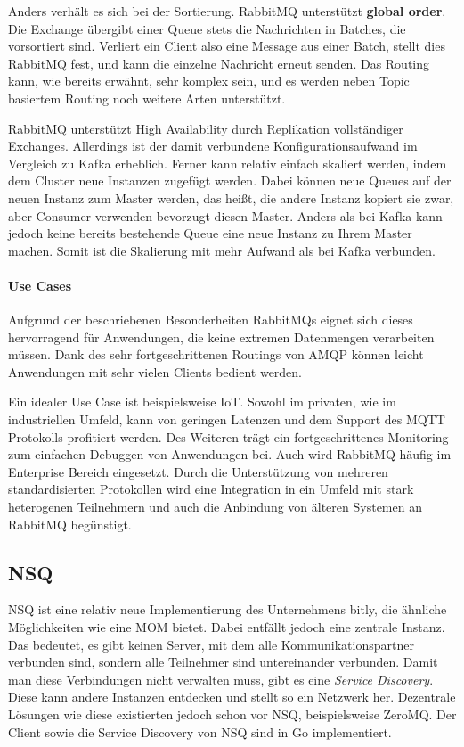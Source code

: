 Anders verhält es sich bei der Sortierung. RabbitMQ unterstützt \textbf{global order}. Die Exchange
übergibt einer Queue stets die Nachrichten in Batches, die vorsortiert sind.
Verliert ein Client also eine Message aus einer Batch, stellt dies RabbitMQ fest,
und kann die einzelne Nachricht erneut senden.
Das Routing kann, wie bereits erwähnt, sehr komplex sein, und es werden neben
Topic basiertem Routing noch weitere Arten unterstützt.

RabbitMQ unterstützt High Availability durch Replikation vollständiger Ex\-changes.
Allerdings ist der damit verbundene Konfigurationsaufwand im Vergleich zu Kafka
erheblich. Ferner kann relativ einfach skaliert werden, indem dem Cluster neue
Instanzen zugefügt werden. Dabei können neue Queues auf der neuen Instanz zum
Master werden, das heißt, die andere Instanz kopiert sie zwar, aber Consumer
verwenden bevorzugt diesen Master. Anders als bei Kafka kann jedoch keine
bereits bestehende Queue eine neue Instanz zu Ihrem Master machen. Somit ist die
Skalierung mit mehr Aufwand als bei Kafka verbunden.
\paragraph{Use Cases}
Aufgrund der beschriebenen Besonderheiten RabbitMQs eignet sich dieses hervorragend
für Anwendungen, die keine extremen Datenmengen verarbeiten müssen. Dank des
sehr fortgeschrittenen Routings von AMQP können leicht Anwendungen mit sehr
vielen Clients bedient werden.

Ein idealer Use Case ist beispielsweise IoT. Sowohl im privaten, wie im
industriellen Umfeld, kann von geringen Latenzen und dem Support des MQTT
Protokolls profitiert werden. Des Weiteren trägt ein fortgeschrittenes
Monitoring zum einfachen Debuggen von Anwendungen bei.
Auch wird RabbitMQ häufig im Enterprise Bereich eingesetzt. Durch die
Unterstützung von mehreren standardisierten Protokollen wird eine Integration in
ein Umfeld mit stark heterogenen Teilnehmern und auch die Anbindung von älteren
Systemen an RabbitMQ begünstigt.

\newpage
\subsection{NSQ}
NSQ ist eine relativ neue Implementierung des Unternehmens bitly, die ähnliche
Möglichkeiten wie eine MOM bietet. Dabei entfällt jedoch eine zentrale Instanz.
Das bedeutet, es gibt keinen Server, mit dem alle Kommunikationspartner verbunden
sind, sondern alle Teilnehmer sind untereinander verbunden.
Damit man diese Verbindungen nicht
verwalten muss, gibt es eine \textit{Service Discovery}. Diese kann andere
Instanzen entdecken und stellt so ein Netzwerk her. Dezentrale Lösungen wie
diese existierten jedoch schon vor NSQ, beispielsweise ZeroMQ.
Der Client sowie die Service Discovery von NSQ sind in Go implementiert. \cite{NSQ:online}

